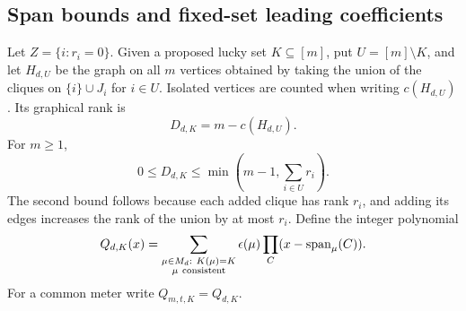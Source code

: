 \documentclass[11pt,a4paper]{article}
\begin{document}
\subsection{Span bounds and fixed-set leading coefficients}

Let $Z=\{i:r_i=0\}$.  Given a proposed lucky set $K\subseteq[m]$, put
$U=[m]\setminus K$, and let $H_{d,U}$ be the graph on all $m$ vertices
obtained by taking the union of the cliques on $\{i\}\cup J_i$ for $i\in U$.
Isolated vertices are counted when writing $c(H_{d,U})$.  Its graphical
rank is
\[
 D_{d,K}=m-c(H_{d,U}).
\]
For $m\ge1$,
\[
 0\le D_{d,K}\le\min\left(m-1,\sum_{i\in U}r_i\right).
\]
The second bound follows because each added clique has rank $r_i$, and
adding its edges increases the rank of the union by at most $r_i$.
Define the integer polynomial
\[
 Q_{d,K}(x)=\sum_{\substack{\mu\in M_d:\ K(\mu)=K\\
                            \mu\ {\rm consistent}}}
                \epsilon(\mu)\prod_C(x-\spn_\mu(C)).
\]
For a common meter write $Q_{m,t,K}=Q_{d,K}$.
\end{document}
